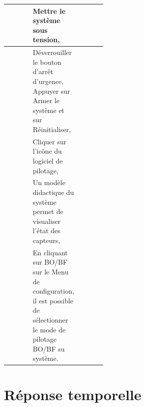 \newcommand{\image}{ControlX}
\newcommand{\nomsysteme}{ControlX}
\newcommand{\nomtitre}{du Control'X}



\begin{tabular}{|Ep{0.4\linewidth}|p{.5\linewidth}|}
\hline
& Mettre le système sous tension,
&\tabularnewline\hline
& Déverrouiller le bouton d'arrêt d'urgence,
Appuyer sur Armer le système et sur Réinitialiser,
&\tabularnewline\hline
 & Cliquer sur l'icône du logiciel de pilotage, 
&
\tabularnewline\hline
 & Un modèle didactique du système permet de visualiser l'état des capteurs,  
&\tabularnewline\hline
 & En cliquant sur BO/BF sur le Menu de configuration, il est possible de sélectionner le mode de pilotage BO/BF su système.
 &
\tabularnewline\hline
\end{tabular}

\section{Réponse temporelle}

\setcounter{rowcounter}{1}


